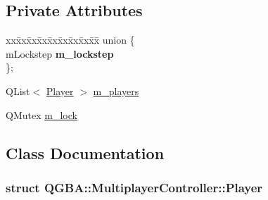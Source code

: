 \subsection*{Private Attributes}
\begin{DoxyCompactItemize}
\item 
\begin{tabbing}
xx\=xx\=xx\=xx\=xx\=xx\=xx\=xx\=xx\=\kill
union \{\\
mLockstep {\bfseries m\_lockstep}\\
\}; \\

\end{tabbing}\item 
Q\+List$<$ \mbox{\hyperlink{class_q_g_b_a_1_1_multiplayer_controller_struct_q_g_b_a_1_1_multiplayer_controller_1_1_player}{Player}} $>$ \mbox{\hyperlink{class_q_g_b_a_1_1_multiplayer_controller_a0564c4f543dfa7adcdbdc70472684c99}{m\+\_\+players}}
\item 
Q\+Mutex \mbox{\hyperlink{class_q_g_b_a_1_1_multiplayer_controller_a517f06034d4984a389644739fcbb3724}{m\+\_\+lock}}
\end{DoxyCompactItemize}


\subsection{Class Documentation}
\label{struct_q_g_b_a_1_1_multiplayer_controller_1_1_player}
\subsubsection{struct Q\+G\+BA\+:\+:Multiplayer\+Controller\+:\+:Player}


